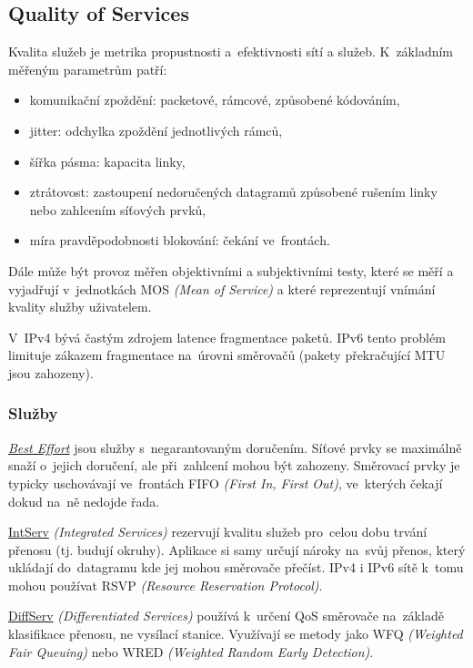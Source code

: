 \subsection{Quality of Services}

Kvalita služeb je metrika propustnosti a~efektivnosti sítí a služeb.
K~základním měřeným parametrům patří:
\begin{itemize}
    \item komunikační zpoždění: packetové, rámcové, způsobené kódováním,
    \item jitter: odchylka zpoždění jednotlivých rámců,
    \item šířka pásma: kapacita linky,
    \item ztrátovost: zastoupení nedoručených datagramů způsobené rušením linky nebo zahlcením síťových prvků,
    \item míra pravděpodobnosti blokování: čekání ve~frontách.
\end{itemize}

Dále může být provoz měřen objektivními a subjektivními testy, které se měří a vyjadřují v~jednotkách MOS \emph{(Mean of Service)} a které reprezentují vnímání kvality služby uživatelem.

V~IPv4 bývá častým zdrojem latence fragmentace paketů.
IPv6 tento problém limituje zákazem fragmentace na~úrovni směrovačů (pakety překračující MTU jsou zahozeny).


\subsubsection{Služby}

\underline{\emph{Best Effort}} jsou služby s~negarantovaným doručením.
Síťové prvky se maximálně snaží o~jejich doručení, ale při~zahlcení mohou být zahozeny.
Směrovací prvky je typicky uschovávají ve~frontách FIFO \emph{(First In, First Out)}, ve~kterých čekají dokud na~ně nedojde řada.

\underline{IntServ} \emph{(Integrated Services)} rezervují kvalitu služeb pro~celou dobu trvání přenosu (tj. budují okruhy).
Aplikace si samy určují nároky na~svůj přenos, který ukládají do~datagramu kde jej mohou směrovače přečíst.
IPv4 i IPv6 sítě k~tomu mohou používat RSVP \emph{(Resource Reservation Protocol)}.

\underline{DiffServ} \emph{(Differentiated Services)} používá k~určení QoS směrovače na~základě klasifikace přenosu, ne vysílací stanice.
Využívají se metody jako WFQ \emph{(Weighted Fair Queuing)} nebo WRED \emph{(Weighted Random Early Detection)}.


